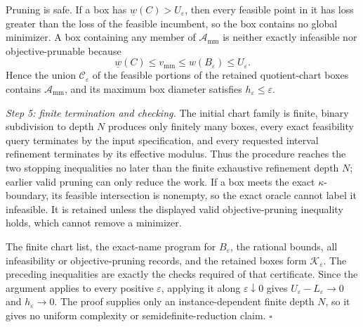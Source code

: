 Pruning is safe.  If a box has \(\underline w(C)>U_{\varepsilon}\), then every feasible point in it has loss greater than the loss of the feasible incumbent, so the box contains no global minimizer.  A box containing any member of \(\mathcal A_{\mathrm{mm}}\) is neither exactly infeasible nor objective-prunable because
\[
\underline w(C)\le v_{\mathrm{mm}}\le w(B_{\varepsilon})\le U_{\varepsilon}.
\]
Hence the union \(\mathcal C_{\varepsilon}\) of the feasible portions of the retained quotient-chart boxes contains \(\mathcal A_{\mathrm{mm}}\), and its maximum box diameter satisfies \(h_{\varepsilon}\le\varepsilon\).

\emph{Step 5: finite termination and checking.}
The initial chart family is finite, binary subdivision to depth \(N\) produces only finitely many boxes, every exact feasibility query terminates by the input specification, and every requested interval refinement terminates by its effective modulus.  Thus the procedure reaches the two stopping inequalities no later than the finite exhaustive refinement depth \(N\); earlier valid pruning can only reduce the work.  If a box meets the exact \(\kappa\)-boundary, its feasible intersection is nonempty, so the exact oracle cannot label it infeasible.  It is retained unless the displayed valid objective-pruning inequality holds, which cannot remove a minimizer.

The finite chart list, the exact-name program for \(B_{\varepsilon}\), the rational bounds, all infeasibility or objective-pruning records, and the retained boxes form \(\mathscr K_{\varepsilon}\).  The preceding inequalities are exactly the checks required of that certificate.  Since the argument applies to every positive \(\varepsilon\), applying it along \(\varepsilon\downarrow0\) gives \(U_{\varepsilon}-L_{\varepsilon}\to0\) and \(h_{\varepsilon}\to0\).  The proof supplies only an instance-dependent finite depth \(N\), so it gives no uniform complexity or semidefinite-reduction claim. \(\square\)